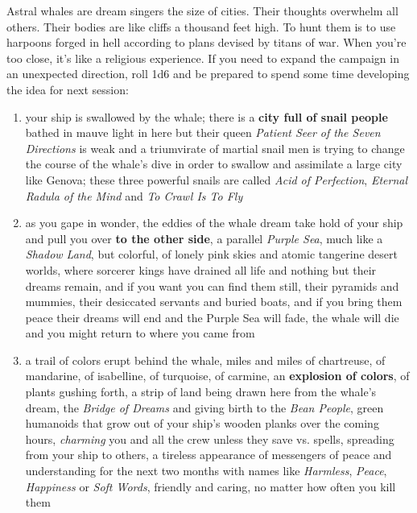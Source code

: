 \documentclass[11pt]{bxart}
\begin{document}
Astral whales are dream singers the size of cities. Their thoughts
overwhelm all others. Their bodies are like cliffs a thousand feet
high. To hunt them is to use harpoons forged in hell according to
plans devised by titans of war. When you're too close, it's like a
religious experience. If you need to expand the campaign in an
unexpected direction, roll 1d6 and be prepared to spend some time
developing the idea for next session:

\begin{enumerate}
\item your ship is swallowed by the whale; there is a \textbf{city
  full of snail people} bathed in mauve light in here but their queen
  \textit{Patient Seer of the Seven Directions} is weak and a
  triumvirate of martial snail men is trying to change the course of
  the whale's dive in order to swallow and assimilate a large city
  like Genova; these three powerful snails are called \textit{Acid of
    Perfection}, \textit{Eternal Radula of the Mind} and \textit{To
    Crawl Is To Fly}


\item as you gape in wonder, the eddies of the whale dream take hold
  of your ship and pull you over \textbf{to the other side}, a
  parallel \textit{Purple Sea}, much like a \textit{Shadow Land}, but
  colorful, of lonely pink skies and atomic tangerine desert worlds,
  where sorcerer kings have drained all life and nothing but their
  dreams remain, and if you want you can find them still, their
  pyramids and mummies, their desiccated servants and buried boats,
  and if you bring them peace their dreams will end and the Purple Sea
  will fade, the whale will die and you might return to where you came
  from

\item a trail of colors erupt behind the whale, miles and miles of
  chartreuse, of mandarine, of isabelline, of turquoise, of carmine,
  an \textbf{explosion of colors}, of plants gushing forth, a strip of
  land being drawn here from the whale's dream, the \textit{Bridge of
    Dreams} and giving birth to the \textit{Bean People}, green
  humanoids that grow out of your ship's wooden planks over the coming
  hours, \textit{charming} you and all the crew unless they save vs.
  spells, spreading from your ship to others, a tireless appearance of
  messengers of peace and understanding for the next two months with
  names like \textit{Harmless}, \textit{Peace}, \textit{Happiness} or
  \textit{Soft Words}, friendly and caring, no matter how often you
  kill them


\end{enumerate}
\end{document}
